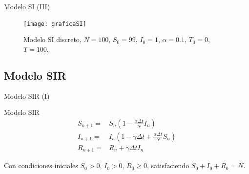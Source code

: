 \begin{frame}{Modelo SI (III)}
    \begin{figure}
        \begin{center}
        \caption{Modelo SI discreto, $N=100$, $S_0=99$, $I_0 = 1$, $\alpha = 0.1$, $T_0 = 0$, $T = 100$.}
        \texttt{[image: graficaSI]}
        \end{center}
    \end{figure}
\end{frame}


\subsection{Modelo SIR}


\begin{frame}{Modelo SIR (I)}

    \begin{block}{Modelo SIR \cite{allenDiscretetimeSISIR1994}}
        \begin{equation}
        \label{eqn: SIR_modelo}
        \begin{aligned}
        S_{n+1} = & S_n \left(1-\frac{\alpha\Delta t}{N} I_n \right) \\
        I_{n+1} = & I_n \left( 1-\gamma \Delta t + \frac{\alpha\Delta t}{N} S_n \right) \\
        R_{n+1} = & R_n + \gamma \Delta t I_n
        \end{aligned}
        \end{equation}
        
        Con condiciones iniciales $S_0>0$, $I_0>0$, $R_0\geq 0$, satisfaciendo $S_0+I_0+R_0=N$.
    \end{block}

    \begin{center}
        \end{center}

\end{frame}


